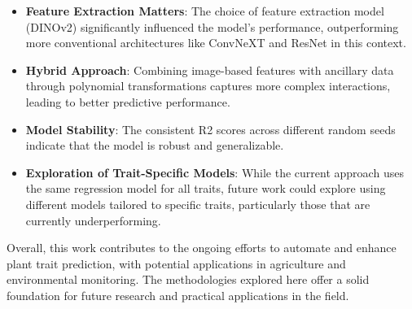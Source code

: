 \documentclass{article}
\begin{document}
\begin{itemize}
	\item \textbf{Feature Extraction Matters}: The choice of feature extraction model (DINOv2) significantly influenced the model's performance, outperforming more conventional architectures like ConvNeXT and ResNet in this context.
	\item \textbf{Hybrid Approach}: Combining image-based features with ancillary data through polynomial transformations captures more complex interactions, leading to better predictive performance.
	\item \textbf{Model Stability}: The consistent R2 scores across different random seeds indicate that the model is robust and generalizable.
	\item \textbf{Exploration of Trait-Specific Models}: While the current approach uses the same regression model for all traits, future work could explore using different models tailored to specific traits, particularly those that are currently underperforming.
\end{itemize}

Overall, this work contributes to the ongoing efforts to automate and enhance plant trait prediction, with potential applications in agriculture and environmental monitoring. The methodologies explored here offer a solid foundation for future research and practical applications in the field.

\newpage

\nocite{*}
\printbibliography[title=References]
\end{document}
